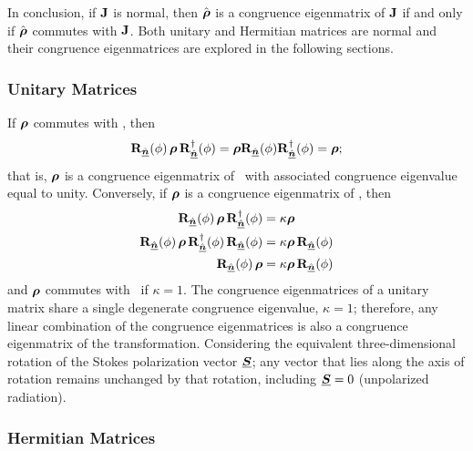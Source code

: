 \noindent
%
In conclusion, if $\JM{J}$ is normal,  then $\hat{\cohM{\rho}}$ is a congruence eigenmatrix of $\JM{J}$ if and only if $\hat{\cohM{\rho}}$ commutes with $\JM{J}$.
%
Both unitary and Hermitian matrices are normal and their congruence eigenmatrices are explored in the following sections.

\subsubsection{ Unitary Matrices}
\label{app:eigen_unitary}

If $\cohM{\rho}$ commutes with \rotat, then
\begin{equation}
\rotat \, \cohM{\rho} \, \vRotation^\dagger(\phi)
= \cohM{\rho}  \rotat \vRotation^\dagger(\phi) 
= \cohM{\rho};
\end{equation}
that is, $\cohM{\rho}$ is a congruence eigenmatrix of \rotat\ with associated congruence eigenvalue equal to unity.
% 
Conversely, if $\cohM{\rho}$ is a congruence eigenmatrix of \rotat, then
\begin{equation}
\begin{split}
\rotat \, \cohM{\rho} \, \vRotation^\dagger(\phi) & = \kappa \cohM{\rho}  \\
\rotat \, \cohM{\rho} \, \vRotation^\dagger(\phi)\, \rotat & = \kappa \cohM{\rho} \, \rotat \\
\rotat \, \cohM{\rho} & = \kappa \cohM{\rho} \, \rotat
\end{split}
\end{equation}
and $\cohM{\rho}$ commutes with \rotat\ if $\kappa = 1$.
\noindent
The congruence eigenmatrices of a unitary matrix share a single 
degenerate congruence eigenvalue, $\kappa=1$; therefore, any linear combination of the congruence eigenmatrices
is also a congruence eigenmatrix of the transformation.
%
Considering the equivalent three-dimensional rotation of the Stokes polarization vector $\Pv{S}$;
any vector that lies along the axis of rotation remains unchanged by that rotation, including $\Pv{S}=0$ (unpolarized radiation).
%


\subsubsection{ Hermitian Matrices }
\label{app:eigen_self_adjoint}

